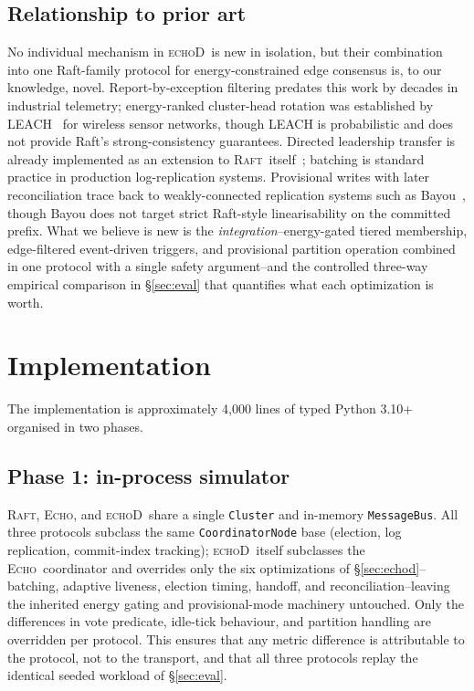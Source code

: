 \documentclass[conference]{IEEEtran}
\newcommand{\echoproto}{\textsc{Echo}\xspace}
\newcommand{\raftproto}{\textsc{Raft}\xspace}
\newcommand{\echodproto}{\textsc{echoD}\xspace}
\begin{document}
\subsection{Relationship to prior art}
No individual mechanism in \echodproto\ is new in isolation, but their
combination into one Raft-family protocol for energy-constrained edge
consensus is, to our knowledge, novel. Report-by-exception filtering
predates this work by decades in industrial telemetry; energy-ranked
cluster-head rotation was established by
LEACH~\cite{heinzelman2000leach} for wireless sensor networks, though
LEACH is probabilistic and does not provide Raft's strong-consistency
guarantees. Directed leadership transfer is already implemented as an
extension to \raftproto\ itself~\cite{ongaro2014dissertation}; batching
is standard practice in production log-replication systems. Provisional
writes with later reconciliation trace back to weakly-connected
replication systems such as Bayou~\cite{terry1995bayou}, though Bayou
does not target strict Raft-style linearisability on the committed
prefix. What we believe is new is the \emph{integration}--energy-gated
tiered membership, edge-filtered event-driven triggers, and provisional
partition operation combined in one protocol with a single safety
argument--and the controlled three-way empirical comparison in
\S\ref{sec:eval} that quantifies what each optimization is worth.

\section{Implementation}\label{sec:impl}

The implementation is approximately 4{,}000 lines of typed Python 3.10+
organised in two phases.

\subsection{Phase 1: in-process simulator}
\raftproto, \echoproto, and \echodproto\ share a single \texttt{Cluster}
and in-memory \texttt{MessageBus}. All three protocols subclass the same
\texttt{CoordinatorNode} base (election, log replication, commit-index
tracking); \echodproto\ itself subclasses the \echoproto\ coordinator
and overrides only the six optimizations of \S\ref{sec:echod}--batching,
adaptive liveness, election timing, handoff, and reconciliation--leaving
the inherited energy gating and provisional-mode machinery untouched.
Only the differences in vote predicate, idle-tick behaviour, and
partition handling are overridden per protocol. This ensures that any
metric difference is attributable to the protocol, not to the
transport, and that all three protocols replay the identical seeded
workload of \S\ref{sec:eval}.
\end{document}
